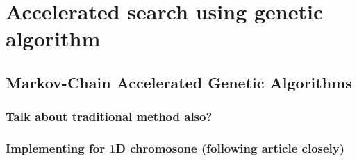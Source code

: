 \section{Accelerated search using genetic algorithm}


\subsection{Markov-Chain Accelerated Genetic Algorithms}

\subsubsection{Talk about traditional method also?}

\subsubsection{Implementing for 1D chromosone (following article closely)}

